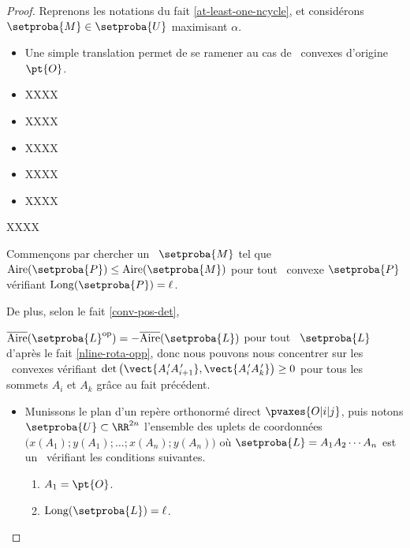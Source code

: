 \begin{proof}
    Reprenons les notations du fait \ref{at-least-one-ncycle}, et considérons $\setproba{M} \in \setproba{U}$ maximisant $\alpha$.
	\begin{itemize}
		\item Une simple translation permet de se ramener au cas de \ngones\ convexes d'origine $\pt{O}$.


		\item XXXX


		\item XXXX


		\item XXXX


		\item XXXX


		\item XXXX
    \end{itemize}
    
    
    
    
    
    
    
	
	XXXX
	
	
	Commençons par chercher un \ncycle\ $\setproba{M}$ tel que $\area{\setproba{P}} \leq \area{\setproba{M}}$ pour tout \ngone\ convexe $\setproba{P}$ vérifiant $\cyclelen{\setproba{P}} = \ell$.
    
    De plus, selon le fait \ref{conv-pos-det},
    
    $\sarea{\setproba{L}^{\mathrm{op}}} = - \sarea{\setproba{L}}$ pour tout \ncycle\ $\setproba{L}$ d'après le fait \ref{nline-rota-opp}, donc nous pouvons nous concentrer sur les \ncycles\ convexes vérifiant $\det \big( \vect{A^{\,\prime}_i A^{\,\prime}_{i+1}}, \vect{A^{\,\prime}_i A^{\,\prime}_k} \big) \geq 0$ pour tous les sommets $A_i$ et $A_k$ grâce au fait précédent.
	


	\begin{itemize}
		\item Munissons le plan d'un repère orthonormé direct $\pvaxes{O | i | j}$, puis notons $\setproba{U} \subset \RR^{2n}$ l'ensemble des uplets de coordonnées $\big( x(A_1) ; y(A_1) ; \dots ; x(A_n) ; y(A_n) \big)$ où $\setproba{L} = A_1 A_2 \cdots A_n$ est un \ncycle\ vérifiant les conditions suivantes.
	    \begin{enumerate}
	    	\item $A_1 = \pt{O}$.

	    	\item $\cyclelen{\setproba{L}} = \ell$.


\end{enumerate}
\end{itemize}
\end{proof}
